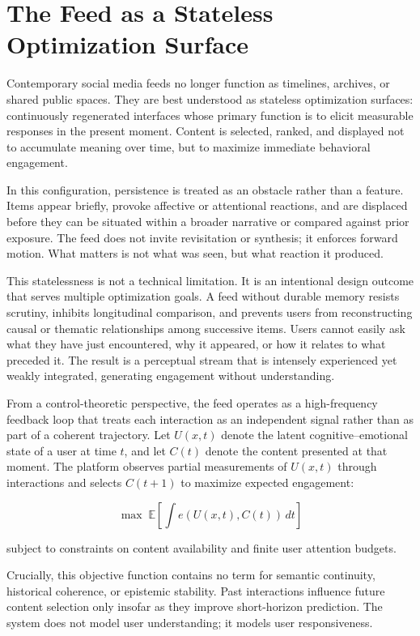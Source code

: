 \documentclass[12pt]{article}
\begin{document}
\section{The Feed as a Stateless Optimization Surface}

Contemporary social media feeds no longer function as timelines, archives, or shared public spaces. They are best understood as stateless optimization surfaces: continuously regenerated interfaces whose primary function is to elicit measurable responses in the present moment. Content is selected, ranked, and displayed not to accumulate meaning over time, but to maximize immediate behavioral engagement.

In this configuration, persistence is treated as an obstacle rather than a feature. Items appear briefly, provoke affective or attentional reactions, and are displaced before they can be situated within a broader narrative or compared against prior exposure. The feed does not invite revisitation or synthesis; it enforces forward motion. What matters is not what was seen, but what reaction it produced.

This statelessness is not a technical limitation. It is an intentional design outcome that serves multiple optimization goals. A feed without durable memory resists scrutiny, inhibits longitudinal comparison, and prevents users from reconstructing causal or thematic relationships among successive items. Users cannot easily ask what they have just encountered, why it appeared, or how it relates to what preceded it. The result is a perceptual stream that is intensely experienced yet weakly integrated, generating engagement without understanding.

From a control-theoretic perspective, the feed operates as a high-frequency feedback loop that treats each interaction as an independent signal rather than as part of a coherent trajectory. Let $U(x,t)$ denote the latent cognitive--emotional state of a user at time $t$, and let $C(t)$ denote the content presented at that moment. The platform observes partial measurements of $U(x,t)$ through interactions and selects $C(t+1)$ to maximize expected engagement:

\[
\max \; \mathbb{E}\!\left[\int e\!\left(U(x,t), C(t)\right)\, dt \right]
\]

subject to constraints on content availability and finite user attention budgets.

Crucially, this objective function contains no term for semantic continuity, historical coherence, or epistemic stability. Past interactions influence future content selection only insofar as they improve short-horizon prediction. The system does not model user understanding; it models user responsiveness.
\end{document}
